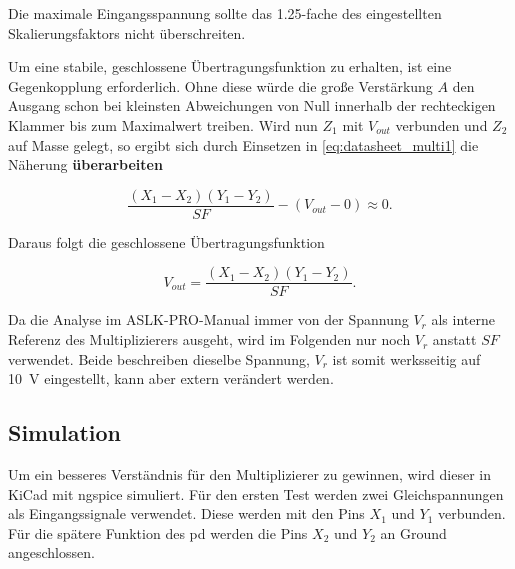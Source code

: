 \documentclass[../main.tex]{subfiles}
\begin{document}
Die maximale Eingangsspannung sollte das \num{1,25}-fache des eingestellten Skalierungsfaktors nicht überschreiten.\par
\medskip

Um eine stabile, geschlossene Übertragungsfunktion zu erhalten, ist eine Gegenkopplung erforderlich. Ohne diese würde die große Verstärkung $A$ den Ausgang schon bei kleinsten Abweichungen von Null innerhalb der rechteckigen Klammer bis zum Maximalwert treiben. Wird nun $Z_1$ mit $V_{out}$ verbunden und $Z_2$ auf Masse gelegt, so ergibt sich durch Einsetzen in \eqref{eq:datasheet_multi1} die Näherung 
\textbf{überarbeiten}

\begin{equation*}
  \frac{(X_1 - X_2)(Y_1 - Y_2)}{SF} - (V_{out} - 0) \approx 0.
\end{equation*}

Daraus folgt die geschlossene Übertragungsfunktion

\begin{equation}
  V_{out} =
  \frac{(X_1 - X_2)(Y_1 - Y_2)}{SF}.
  \label{eq:datasheet_multi2}
\end{equation}

Da die Analyse im ASLK-PRO-Manual immer von der Spannung $V_r$ als interne Referenz des Multiplizierers ausgeht, wird im Folgenden nur noch $V_r$ anstatt $SF$ verwendet. Beide beschreiben dieselbe Spannung, $V_r$ ist somit werksseitig auf \SI{10}{\volt} eingestellt, kann aber extern verändert werden.\par
 

\subsection{Simulation}
Um ein besseres Verständnis für den Multiplizierer zu gewinnen, wird dieser in KiCad mit ngspice simuliert. Für den ersten Test werden zwei Gleichspannungen als Eingangssignale verwendet. Diese werden mit den Pins $X_1$ und $Y_1$ verbunden. Für die spätere Funktion des \gls{pd} werden die Pins $X_2$ und $Y_2$ an Ground angeschlossen. %
\end{document}
